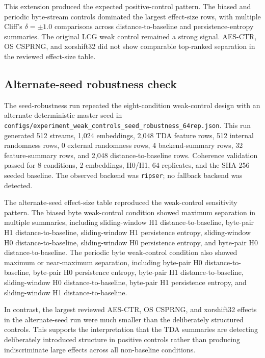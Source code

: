 This extension produced the expected positive-control pattern. The biased and periodic byte-stream controls dominated the largest effect-size rows, with multiple Cliff's $\delta = \pm 1.0$ comparisons across distance-to-baseline and persistence-entropy summaries. The original LCG weak control remained a strong signal. AES-CTR, OS CSPRNG, and xorshift32 did not show comparable top-ranked separation in the reviewed effect-size table.

\subsection{Alternate-seed robustness check}
\label{subsec:seed-robustness-results}

The seed-robustness run repeated the eight-condition weak-control design with an alternate deterministic master seed in \texttt{configs/experiment\_weak\_controls\_seed\_robustness\_64rep.json}. This run generated 512 streams, 1,024 embeddings, 2,048 TDA feature rows, 512 internal randomness rows, 0 external randomness rows, 4 backend-summary rows, 32 feature-summary rows, and 2,048 distance-to-baseline rows. Coherence validation passed for 8 conditions, 2 embeddings, H0/H1, 64 replicates, and the SHA-256 seeded baseline. The observed backend was \texttt{ripser}; no fallback backend was detected.

The alternate-seed effect-size table reproduced the weak-control sensitivity pattern. The biased byte weak-control condition showed maximum separation in multiple summaries, including sliding-window H1 distance-to-baseline, byte-pair H1 distance-to-baseline, sliding-window H1 persistence entropy, sliding-window H0 distance-to-baseline, sliding-window H0 persistence entropy, and byte-pair H0 distance-to-baseline. The periodic byte weak-control condition also showed maximum or near-maximum separation, including byte-pair H0 distance-to-baseline, byte-pair H0 persistence entropy, byte-pair H1 distance-to-baseline, sliding-window H0 distance-to-baseline, byte-pair H1 persistence entropy, and sliding-window H1 distance-to-baseline.



In contrast, the largest reviewed AES-CTR, OS CSPRNG, and xorshift32 effects in the alternate-seed run were much smaller than the deliberately structured controls. This supports the interpretation that the TDA summaries are detecting deliberately introduced structure in positive controls rather than producing indiscriminate large effects across all non-baseline conditions.

